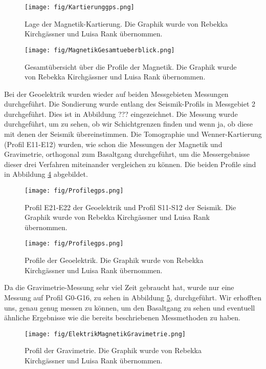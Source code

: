\begin{figure}[ht]
 \centering
 \texttt{[image: fig/Kartierunggps.png]}
 \caption[Lage der Magnetik-Kartierung]{Lage der Magnetik-Kartierung. Die Graphik wurde von Rebekka Kirchgässner und Luisa Rank übernommen.}
 \label{abb:Kart}
\end{figure}

\begin{figure}[ht]
 \centering
 \texttt{[image: fig/MagnetikGesamtueberblick.png]}
 \caption[Gesamtübersicht über die Profile der Magnetik]{Gesamtübersicht über die Profile der Magnetik. Die Graphik wurde von Rebekka Kirchgässner und Luisa Rank übernommen.}
 \label{abb:Magnetik}
\end{figure}

Bei der Geoelektrik wurden wieder auf beiden Messgebieten Messungen durchgeführt. Die Sondierung wurde entlang des Seismik-Profils in Messgebiet 2 durchgeführt. Dies ist in 
Abbildung ??? eingezeichnet. Die Messung wurde durchgeführt, um zu sehen, ob wir Schichtgrenzen finden und wenn ja, ob diese mit denen der Seismik übereinstimmen.
Die Tomographie und Wenner-Kartierung (Profil E11-E12) wurden, wie schon die Messungen der Magnetik und Gravimetrie, orthogonal zum Basaltgang durchgeführt, um die Messergebnisse dieser drei Verfahren
miteinander vergleichen zu können. Die beiden Profile sind in Abbildung \ref{abb:Geoelek} abgebildet.

\begin{figure}[ht]
 \centering
 \texttt{[image: fig/Profilegps.png]}
 \caption[Profil E21-E22 der Geoelektrik und Profil S11-S12 der Seismik]{Profil E21-E22 der Geoelektrik und Profil S11-S12 der Seismik. Die Graphik wurde von Rebekka Kirchgässner und Luisa Rank übernommen.}
 \label{abb:Geoelek}
\end{figure}

\begin{figure}[ht]
 \centering
 \texttt{[image: fig/Profilegps.png]}
 \caption[Profile der Geoelektrik]{Profile der Geoelektrik. Die Graphik wurde von Rebekka Kirchgässner und Luisa Rank übernommen.}
 \label{abb:Geoelek}
\end{figure}

Da die Gravimetrie-Messung sehr viel Zeit gebraucht hat, wurde nur eine Messung auf Profil G0-G16, zu sehen in Abbildung \ref{abb:Geoelek2}, durchgeführt. Wir erhofften uns, genau genug
messen zu können, um den Basaltgang zu sehen und eventuell ähnliche Ergebnisse wie die bereits beschriebenen Messmethoden zu haben.

\begin{figure}[ht]
 \centering
 \texttt{[image: fig/ElektrikMagnetikGravimetrie.png]}
 \caption[Profil der Gravimetrie]{Profil der Gravimetrie. Die Graphik wurde von Rebekka Kirchgässner und Luisa Rank übernommen.}
 \label{abb:Geoelek2}
\end{figure}